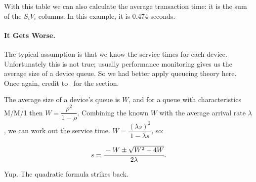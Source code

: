 With this table we can also calculate the average transaction time: it is the sum of the $S_{i}V_{i}$ columns. In this example, it is 0.474 seconds. 

\paragraph*{It Gets Worse.}

The typical assumption is that we know the service times for each device. Unfortunately this is not true; usually performance monitoring gives us the average size of a device queue. So we had better apply queueing theory here. Once again, credit to~\cite{williams-calc} for the section. 

The average size of a device's queue is $W$, and for a queue with characteristics M/M/1 then $W = \dfrac{\rho^{2}}{1-\rho}$. Combining the known $W$ with the average arrival rate $\lambda$, we can work out the service time. $W = \dfrac{(\lambda s)^{2}}{1 - \lambda s}$, so:

\[ s = \cfrac{-W \pm \sqrt{W^{2}+4W}}{2\lambda}.\]

Yup. The quadratic formula strikes back. 





